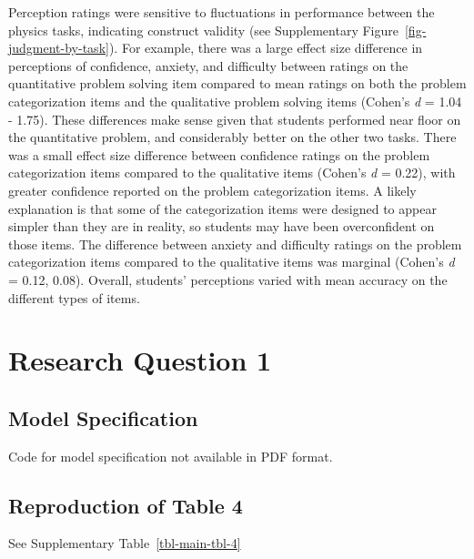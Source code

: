 \documentclass[
  letterpaper,
  DIV=11,
  numbers=noendperiod]{scrreprt}
\begin{document}
Perception ratings were sensitive to fluctuations in performance between
the physics tasks, indicating construct validity (see Supplementary
Figure~\ref{fig-judgment-by-task}). For example, there was a large
effect size difference in perceptions of confidence, anxiety, and
difficulty between ratings on the quantitative problem solving item
compared to mean ratings on both the problem categorization items and
the qualitative problem solving items (Cohen's \emph{d} = 1.04 - 1.75).
These differences make sense given that students performed near floor on
the quantitative problem, and considerably better on the other two
tasks. There was a small effect size difference between confidence
ratings on the problem categorization items compared to the qualitative
items (Cohen's \emph{d} = 0.22), with greater confidence reported on the
problem categorization items. A likely explanation is that some of the
categorization items were designed to appear simpler than they are in
reality, so students may have been overconfident on those items. The
difference between anxiety and difficulty ratings on the problem
categorization items compared to the qualitative items was marginal
(Cohen's \emph{d} = 0.12, 0.08). Overall, students' perceptions varied
with mean accuracy on the different types of items.

\chapter{Research Question 1}\label{research-question-1}

\section{Model Specification}\label{model-specification}

Code for model specification not available in PDF format.

\section{Reproduction of Table 4}\label{reproduction-of-table-4}

See Supplementary Table~\ref{tbl-main-tbl-4}
\end{document}
